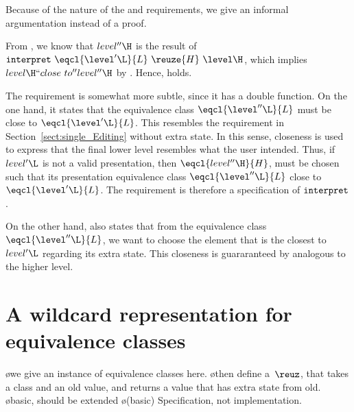 Because of the nature of the  and  requirements, we give an informal argumentation instead of a proof. 

From , we know that $level''\H$ is the result of  $\interpret~ \eqcl{\level'\L}{L}  ~\reuze{H}~   \level\H$, which implies $level\H ``close~to'' level''\H$ by . Hence,  holds.

The  requirement is somewhat more subtle, since it has a double function. On the one hand, it states that the equivalence class $\eqcl{\level''\L}{L}$ must be close to $\eqcl{\level'\L}{L}$. This resembles the  requirement in Section~\ref{sect:single_Editing} without extra state. In this sense, closeness is used to express that the final lower level resembles what the user intended. Thus, if $level'\L$ is not a valid presentation, then $\eqcl{level''\H}{H}$, must be chosen such that its presentation equivalence class $\eqcl{\level''\L}{L}$ close to $\eqcl{\level'\L}{L}$. The requirement is therefore a specification of ${\tt interpret}$.


On the other hand,  also states that from the equivalence class $\eqcl{\level''\L}{L}$,
 we want to choose the element that is the closest to $level'\L$ regarding its extra state. This closeness is guararanteed by  analogous to the higher level.



%																
%																
%																
\section{A wildcard representation for equivalence classes} \label{sect:wildcardEq}

\bl
\o we give an instance of equivalence classes here.
\o then define a~$\reuz$, that takes a class and an old value, and returns a value that has extra state from old.
\o basic, should be extended
\o (basic) Specification, not implementation. 
\el

%

